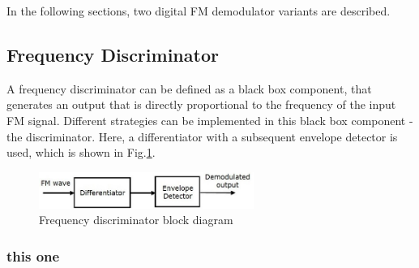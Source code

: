 
In the following sections, two digital FM demodulator variants are described.


\subsection{Frequency Discriminator}


A frequency discriminator can be defined as a black box component, that generates an output that is directly proportional to the frequency of the input FM signal.
Different strategies can be implemented in this black box component - the discriminator.
Here, a differentiator with a subsequent envelope detector is used, which is shown in Fig.\ref{fig_bd_freq_discriminator}.

\begin{figure}[!h]
  \centering
  \includegraphics[width=7cm]{img/discrimination_method_bd1.jpg}
  \caption{Frequency discriminator block diagram \cite{ref_fig_freq_discriminator}}
  \label{fig_bd_freq_discriminator}
\end{figure}

\subsubsection{this one}

